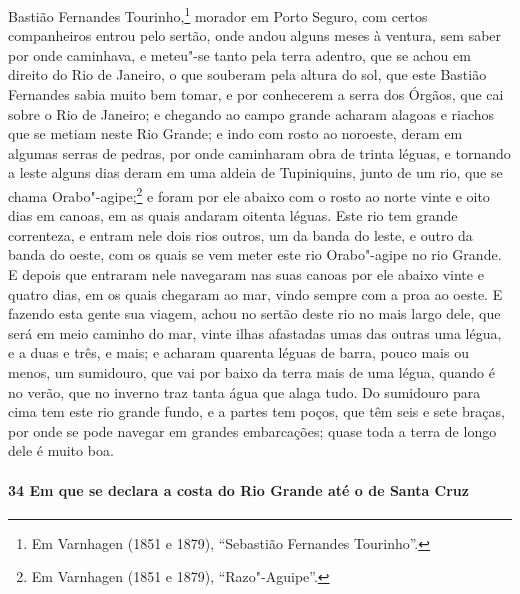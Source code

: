 Bastião Fernandes Tourinho,\footnote{ Em Varnhagen (1851 e 1879), ``Sebastião Fernandes
Tourinho''.} morador em Porto Seguro, com certos companheiros entrou pelo sertão, onde
andou alguns meses à ventura, sem saber por onde caminhava, e meteu"-se tanto pela terra
adentro, que se achou em direito do Rio de Janeiro, o que souberam pela altura do sol, que
este Bastião Fernandes sabia muito bem tomar, e por conhecerem a serra dos Órgãos, que cai
sobre o Rio de Janeiro; e chegando ao campo grande acharam alagoas e riachos que se metiam
neste Rio Grande; e indo com rosto ao noroeste, deram em algumas serras de pedras, por
onde caminharam obra de trinta léguas, e tornando a leste alguns dias deram em uma aldeia
de Tupiniquins, junto de um rio, que se chama Orabo"-agipe;\footnote{ Em Varnhagen (1851 e
1879), ``Razo"-Aguipe''.} e foram por ele abaixo com o rosto ao norte vinte e oito dias em
canoas, em as quais andaram oitenta léguas. Este rio tem grande correnteza, e entram nele
dois rios outros, um da banda do leste, e outro da banda do oeste, com os quais se vem
meter este rio Orabo"-agipe no rio Grande. E depois que entraram nele navegaram nas suas
canoas por ele abaixo vinte e quatro dias, em os quais chegaram ao mar, vindo sempre com a
proa ao oeste. E fazendo esta gente sua viagem, achou no sertão deste rio no mais largo
dele, que será em meio caminho do mar, vinte ilhas afastadas umas das outras uma légua, e
a duas e três, e mais; e acharam quarenta léguas de barra, pouco mais ou menos, um
sumidouro, que vai por baixo da terra mais de uma légua, quando é no verão, que no inverno
traz tanta água que alaga tudo. Do sumidouro para cima tem este rio grande fundo, e a
partes tem poços, que têm seis e sete braças, por onde se pode navegar em grandes
embarcações; quase toda a terra de longo dele é muito boa.

\paragraph{34 Em que se declara a costa do Rio Grande até o de Santa Cruz}

